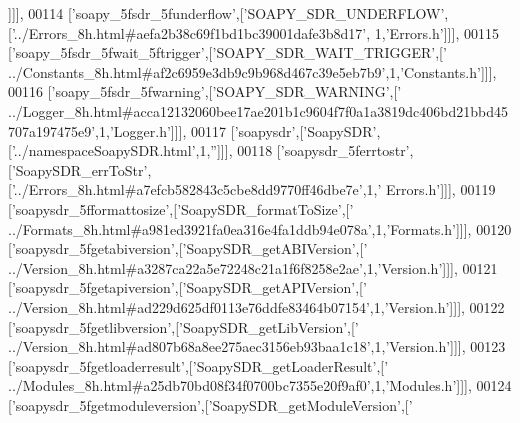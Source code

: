 \begin{DoxyCode}
      ]]],
00114   [\textcolor{stringliteral}{'soapy\_5fsdr\_5funderflow'},[\textcolor{stringliteral}{'SOAPY\_SDR\_UNDERFLOW'},[\textcolor{stringliteral}{'../Errors\_8h.html#aefa2b38c69f1bd1bc39001dafe3b8d17'},
      1,\textcolor{stringliteral}{'Errors.h'}]]],
00115   [\textcolor{stringliteral}{'soapy\_5fsdr\_5fwait\_5ftrigger'},[\textcolor{stringliteral}{'SOAPY\_SDR\_WAIT\_TRIGGER'},[\textcolor{stringliteral}{'
      ../Constants\_8h.html#af2c6959e3db9c9b968d467c39e5eb7b9'},1,\textcolor{stringliteral}{'Constants.h'}]]],
00116   [\textcolor{stringliteral}{'soapy\_5fsdr\_5fwarning'},[\textcolor{stringliteral}{'SOAPY\_SDR\_WARNING'},[\textcolor{stringliteral}{'
      ../Logger\_8h.html#acca12132060bee17ae201b1c9604f7f0a1a3819dc406bd21bbd45707a197475e9'},1,\textcolor{stringliteral}{'Logger.h'}]]],
00117   [\textcolor{stringliteral}{'soapysdr'},[\textcolor{stringliteral}{'SoapySDR'},[\textcolor{stringliteral}{'../namespaceSoapySDR.html'},1,\textcolor{stringliteral}{''}]]],
00118   [\textcolor{stringliteral}{'soapysdr\_5ferrtostr'},[\textcolor{stringliteral}{'SoapySDR\_errToStr'},[\textcolor{stringliteral}{'../Errors\_8h.html#a7efcb582843c5cbe8dd9770ff46dbe7e'},1,\textcolor{stringliteral}{'
      Errors.h'}]]],
00119   [\textcolor{stringliteral}{'soapysdr\_5fformattosize'},[\textcolor{stringliteral}{'SoapySDR\_formatToSize'},[\textcolor{stringliteral}{'
      ../Formats\_8h.html#a981ed3921fa0ea316e4fa1ddb94e078a'},1,\textcolor{stringliteral}{'Formats.h'}]]],
00120   [\textcolor{stringliteral}{'soapysdr\_5fgetabiversion'},[\textcolor{stringliteral}{'SoapySDR\_getABIVersion'},[\textcolor{stringliteral}{'
      ../Version\_8h.html#a3287ca22a5e72248c21a1f6f8258e2ae'},1,\textcolor{stringliteral}{'Version.h'}]]],
00121   [\textcolor{stringliteral}{'soapysdr\_5fgetapiversion'},[\textcolor{stringliteral}{'SoapySDR\_getAPIVersion'},[\textcolor{stringliteral}{'
      ../Version\_8h.html#ad229d625df0113e76ddfe83464b07154'},1,\textcolor{stringliteral}{'Version.h'}]]],
00122   [\textcolor{stringliteral}{'soapysdr\_5fgetlibversion'},[\textcolor{stringliteral}{'SoapySDR\_getLibVersion'},[\textcolor{stringliteral}{'
      ../Version\_8h.html#ad807b68a8ee275aec3156eb93baa1c18'},1,\textcolor{stringliteral}{'Version.h'}]]],
00123   [\textcolor{stringliteral}{'soapysdr\_5fgetloaderresult'},[\textcolor{stringliteral}{'SoapySDR\_getLoaderResult'},[\textcolor{stringliteral}{'
      ../Modules\_8h.html#a25db70bd08f34f0700bc7355e20f9af0'},1,\textcolor{stringliteral}{'Modules.h'}]]],
00124   [\textcolor{stringliteral}{'soapysdr\_5fgetmoduleversion'},[\textcolor{stringliteral}{'SoapySDR\_getModuleVersion'},[\textcolor{stringliteral}{'
}
\end{DoxyCode}
